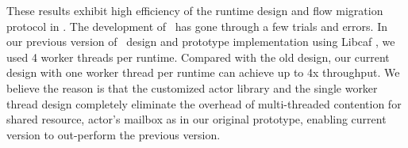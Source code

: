 These results exhibit high efficiency of the runtime design and flow migration protocol in \nfactor. %
 The development of \nfactor~has gone through a few trials and errors. In our previous version of \nfactor~design and prototype implementation using Libcaf \cite{caf}, we used 4 worker threads per runtime. Compared with the old design, our current design with one worker thread per runtime can achieve up to 4x throughput. We believe the reason is that the customized actor library and the single worker thread design completely eliminate the overhead of multi-threaded contention for shared resource, \ie actor's mailbox as in our original prototype, enabling current version to out-perform the previous version.



